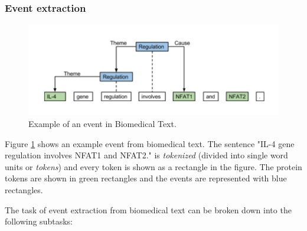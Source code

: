 \subsubsection{Event extraction}

\begin{figure}
\centering
\includegraphics[scale=0.4]{figures/EventExample.png}
\caption{Example of an event in Biomedical Text.}\label{fig:eventExample}
\end{figure}

Figure \ref{fig:eventExample} shows an example event from biomedical text. The sentence "IL-4 gene regulation involves NFAT1 and NFAT2." is \textit{tokenized} (divided into single word units or \textit{tokens}) and every token is shown as a rectangle in the figure. The protein tokens are shown in green rectangles and the events are represented with blue rectangles.

The task of event extraction from biomedical text can be broken down into the following subtasks:

